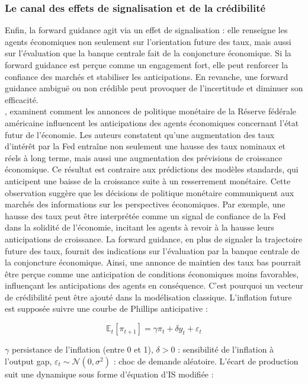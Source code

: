 \subsubsection{ Le canal des effets de signalisation et de la crédibilité}

Enfin, la forward guidance agit via un effet de signalisation : elle renseigne les agents économiques non seulement sur l'orientation future des taux, mais aussi sur l’évaluation que la banque centrale fait de la conjoncture économique. Si la forward guidance est perçue comme un engagement fort, elle peut renforcer la confiance des marchés et stabiliser les anticipations. En revanche, une forward guidance ambiguë ou non crédible peut provoquer de l’incertitude et diminuer son efficacité.\\

\citep{nakamura2018}, examinent comment les annonces de politique monétaire de la Réserve fédérale américaine influencent les anticipations des agents économiques concernant l'état futur de l'économie. Les auteurs constatent qu'une augmentation des taux d'intérêt par la Fed entraîne non seulement une hausse des taux nominaux et réels à long terme, mais aussi une augmentation des prévisions de croissance économique. Ce résultat est contraire aux prédictions des modèles standards, qui anticipent une baisse de la croissance suite à un resserrement monétaire. Cette observation suggère que les décisions de politique monétaire communiquent aux marchés des informations sur les perspectives économiques. Par exemple, une hausse des taux peut être interprétée comme un signal de confiance de la Fed dans la solidité de l'économie, incitant les agents à revoir à la hausse leurs anticipations de croissance. La forward guidance, en plus de signaler la trajectoire future des taux, fournit des indications sur l'évaluation par la banque centrale de la conjoncture économique. Ainsi, une annonce de maintien des taux bas pourrait être perçue comme une anticipation de conditions économiques moins favorables, influençant les anticipations des agents en conséquence. C'est pourquoi un vecteur de crédibilité peut être ajouté dans la modélisation classique. L’inflation future est supposée suivre une courbe de Phillips anticipative :

\begin{equation}
\mathbb{E}_t [\pi_{t+1}] = \gamma \pi_t + \delta y_t + \varepsilon_t
\end{equation}

\( \gamma \) persistance de l’inflation (entre 0 et 1), \( \delta > 0 \) : sensibilité de l’inflation à l’output gap, \( \varepsilon_t \sim \mathcal{N}(0, \sigma^2) \) : choc de demande aléatoire.  L’écart de production suit une dynamique sous forme d’équation d’IS modifiée :

